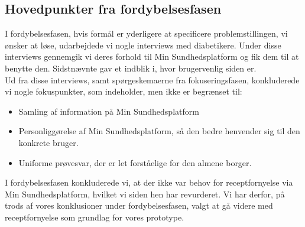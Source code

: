 \subsection{Hovedpunkter fra fordybelsesfasen}
I fordybelsesfasen, hvis formål er yderligere at specificere problemstillingen, vi ønsker at løse, udarbejdede vi nogle interviews med diabetikere. Under disse interviews gennemgik vi deres forhold til Min Sundhedsplatform og fik dem til at benytte den. Sidstnævnte gav et indblik i, hvor brugervenlig siden er.\\
Ud fra disse interviews, samt spørgeskemaerne fra fokuseringsfasen, konkluderede vi nogle fokuspunkter, som indeholder, men ikke er begrænset til:
\begin{itemize}
  \item Samling af information på Min Sundhedsplatform
  \item Personliggørelse af Min Sundhedsplatform, så den bedre henvender sig til den konkrete bruger.
  \item Uniforme prøvesvar, der er let forståelige for den almene borger.
\end{itemize}
I fordybelsesfasen konkluderede vi, at der ikke var behov for receptfornyelse via Min Sundhedsplatform, hvilket vi siden hen har revurderet. Vi har derfor, på trods af vores konklusioner under fordybelsesfasen, valgt at gå videre med receptfornyelse som grundlag for vores prototype. 

